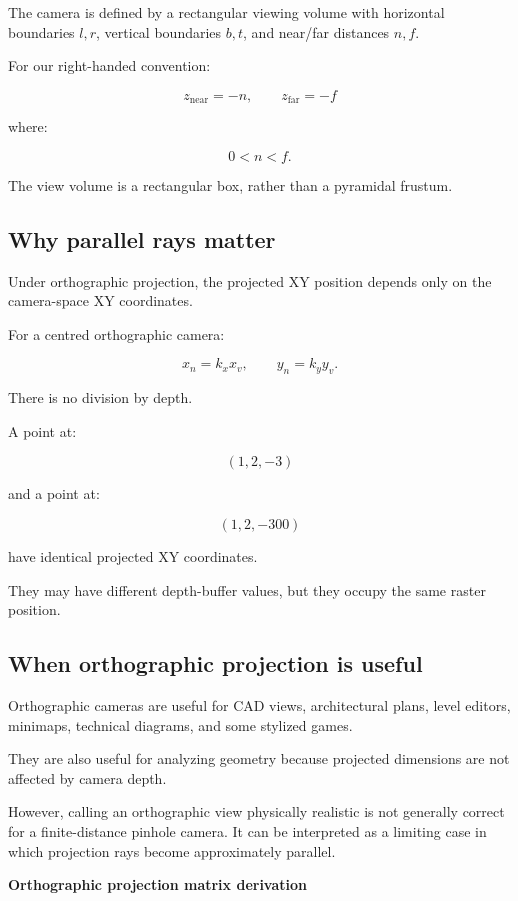 The camera is defined by a rectangular viewing volume with horizontal boundaries \(l,r\), vertical boundaries \(b,t\), and near/far distances \(n,f\).

For our right-handed convention:

\[
 z_{\mathrm{near}}=-n, \qquad z_{\mathrm{far}}=-f
\]

where:

\[
 0<n<f.
\]

The view volume is a rectangular box, rather than a pyramidal frustum.

\subsection{Why parallel rays matter}\label{02-foundations-ii-ch033-why-parallel-rays-matter}

Under orthographic projection, the projected XY position depends only on the camera-space XY coordinates.

For a centred orthographic camera:

\[
 x_n=k_xx_v, \qquad y_n=k_yy_v.
\]

There is no division by depth.

A point at:

\[
 (1,2,-3)
\]

and a point at:

\[
 (1,2,-300)
\]

have identical projected XY coordinates.

They may have different depth-buffer values, but they occupy the same raster position.

\subsection{When orthographic projection is useful}\label{02-foundations-ii-ch033-when-orthographic-projection-is-useful}

Orthographic cameras are useful for CAD views, architectural plans, level editors, minimaps, technical diagrams, and some stylized games.

They are also useful for analyzing geometry because projected dimensions are not affected by camera depth.

However, calling an orthographic view physically realistic is not generally correct for a finite-distance pinhole camera. It can be interpreted as a limiting case in which projection rays become approximately parallel.

\textbf{Orthographic projection matrix derivation}

